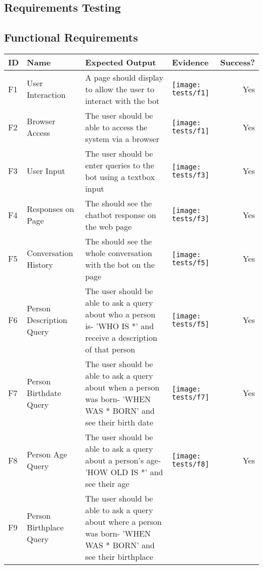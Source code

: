 \begin{landscape}
	\section{Requirements Testing}
	\subsection{Functional Requirements}
	\begin{tabularx}{\hsize}{lXXXr}
		\toprule
		ID & Name & Expected Output & Evidence & Success? \\
		\midrule
		F1 & User Interaction 
		& A page should display to allow the user to interact with the bot
		& \texttt{[image: tests/f1]} & Yes \\
		\midrule
		F2 & Browser Access
		& The user should be able to access the system via a browser
		& \texttt{[image: tests/f1]} & Yes \\
		\midrule
		F3 & User Input
		& The user should be enter queries to the bot using a textbox input
		& \texttt{[image: tests/f3]} & Yes \\
		\midrule
		F4 & Responses on Page
		& The should see the chatbot response on the web page
		& \texttt{[image: tests/f3]} & Yes \\
		\midrule
		F5 & Conversation History
		& The should see the whole conversation with the bot on the page
		& \texttt{[image: tests/f5]} & Yes \\
		\midrule
		F6 & Person Description Query
		& The user should be able to ask a query about who a person is\newline - 'WHO IS *' and receive a description of that person
		& \texttt{[image: tests/f5]} & Yes \\
		\midrule
		F7 & Person Birthdate Query
		& The user should be able to ask a query about when a person was born\newline - 'WHEN WAS * BORN' and see their birth date
		& \texttt{[image: tests/f7]} & Yes \\
		\midrule
		F8 & Person Age Query
		& The user should be able to ask a query about a person's age\newline - 'HOW OLD IS *' and see their age
		& \texttt{[image: tests/f8]} & Yes \\
		\midrule
		F9 & Person Birthplace Query
		& The user should be able to ask a query about where a person was born\newline - 'WHEN WAS * BORN' and see their birthplace

\end{tabularx}
\end{landscape}
